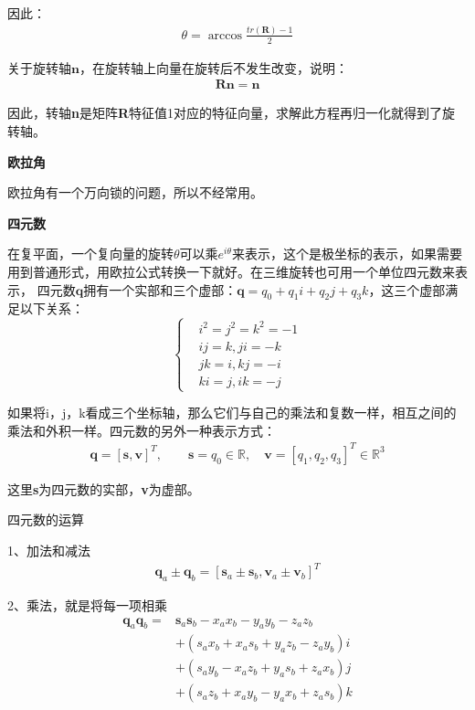 \documentclass[10pt]{article}
\begin{document}
因此：
\begin{align}
    \theta=\arccos\frac{tr(\textbf{R})-1}{2}  
\end{align}

关于旋转轴$\textbf{n}$，在旋转轴上向量在旋转后不发生改变，说明：
\begin{align}
    \mathbf{Rn}=\mathbf{n}
\end{align}

因此，转轴\textbf{n}是矩阵\textbf{R}特征值1对应的特征向量，求解此方程再归一化就得到了旋转轴。

\textbf{欧拉角}

欧拉角有一个万向锁的问题，所以不经常用。

\textbf{四元数}

在复平面，一个复向量的旋转$\theta$可以乘$e^{i\theta}$来表示，这个是极坐标的表示，如果需要用到普通形式，用欧拉公式转换一下就好。在三维旋转也可用一个单位四元数来表示，
四元数$\mathbf{q}$拥有一个实部和三个虚部：$\mathbf{q}=q_0+q_1i+q_2j+q_3k$，这三个虚部满足以下关系：
\begin{equation} %
   \left\{\begin{aligned} 
   &i^2=j^2=k^2=-1\\
   &ij=k,ji=-k\\
   &jk=i,kj=-i\\
   &ki=j,ik=-j
    \end{aligned}\right.
\end{equation}

如果将i，j，k看成三个坐标轴，那么它们与自己的乘法和复数一样，相互之间的乘法和外积一样。四元数的另外一种表示方式：
\begin{align}
    \mathbf{q}=[\mathbf{s},\mathbf{v}]^T,\qquad \mathbf{s}=q_0\in \mathbb{R},\quad \mathbf{v}=[q_1,q_2,q_3]^T \in \mathbb{R}^{3} 
\end{align}

这里\textbf{s}为四元数的实部，\textbf{v}为虚部。

四元数的运算

1、加法和减法
\begin{align}
    \mathbf{q}_a\pm \mathbf{q}_b=[\mathbf{s}_a\pm\mathbf{s}_b,\mathbf{v}_a\pm\mathbf{v}_b]^T 
\end{align}

2、乘法，就是将每一项相乘
\begin{equation}
\begin{aligned}
    \mathbf{q}_a \mathbf{q}_b=&\mathbf{s}_a\mathbf{s}_b-x_ax_b-y_ay_b-z_az_b\\
    &+(s_ax_b+x_as_b+y_az_b-z_ay_b)i\\
    &+(s_ay_b-x_az_b+y_as_b+z_ax_b)j\\
    &+(s_az_b+x_ay_b-y_ax_b+z_as_b)k 
\end{aligned}
\end{equation}
\end{document}
